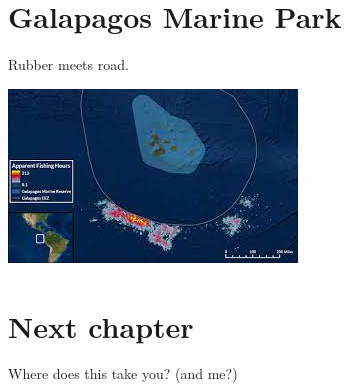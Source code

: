 \documentclass[
]{book}
\begin{document}
\hypertarget{galapagos-marine-park}{%
\chapter{Galapagos Marine Park}\label{galapagos-marine-park}}

Rubber meets road.

\begin{center}\includegraphics{_images/chinese} \end{center}

\hypertarget{next-chapter}{%
\chapter{Next chapter}\label{next-chapter}}

Where does this take you? (and me?)

  
\end{document}
